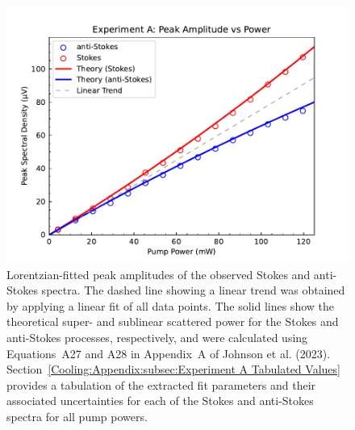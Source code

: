 \begin{figure}[t!]
  \centering
  \includegraphics[width=\textwidth]{figs/3-Cooling/P-O Heights vs Pow.pdf}
  \caption{Lorentzian-fitted peak amplitudes of the observed Stokes and anti-Stokes spectra. The dashed line showing a linear trend was obtained by applying a linear fit of all data points. The solid lines show the theoretical super- and sublinear scattered power for the Stokes and anti-Stokes processes, respectively, and were calculated using Equations~A27 and A28 in Appendix~A of Johnson et al. (2023)\cite{johnson2023laser}. Section~\ref{Cooling:Appendix:subsec:Experiment A Tabulated Values} provides a tabulation of the extracted fit parameters and their associated uncertainties for each of the Stokes and anti-Stokes spectra for all pump powers.}
  \label{fig:Cooling:P-O Heights vs Pow}
\end{figure}

